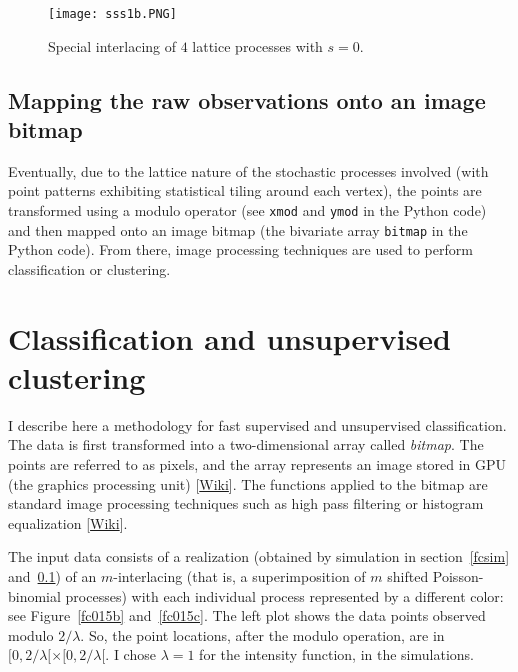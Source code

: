 \documentclass[oneside,10pt]{book}
\begin{document}
\begin{figure}[H]
\centering
\texttt{[image: sss1b.PNG]}
\caption{Special interlacing of $4$ lattice processes with $s=0$.}
\label{fcsss1}
\end{figure}

\subsection{Mapping the raw observations onto an image bitmap} \label{fcmap}

 Eventually, due to the lattice nature of the stochastic processes involved (with point patterns exhibiting statistical tiling around each vertex), the points are transformed using a modulo operator (see \texttt{xmod} and \texttt{ymod} in the Python code) and then mapped onto an image bitmap (the bivariate array \texttt{bitmap} in the Python code).
From there, image processing techniques are used to perform classification or clustering.

\section{Classification and unsupervised clustering}

I describe here a methodology for fast supervised and unsupervised
classification. The data is first transformed into a
two-dimensional array called {\em bitmap}. The points are referred to as pixels, and the array represents an image stored in
\textcolor{index}{GPU}
(the graphics processing unit) [\href{https://en.wikipedia.org/wiki/General-purpose_computing_on_graphics_processing_units}{Wiki}]. The functions applied to the bitmap are standard image processing techniques such as high pass filtering or
\textcolor{index}{histogram equalization} [\href{https://en.wikipedia.org/wiki/Histogram_equalization}{Wiki}].

The input data consists of a realization (obtained by simulation in section~\ref{fcsim} and~\ref{fcmap}) of an
\textcolor{index}{$m$-interlacing} (that is, a superimposition of $m$ shifted Poisson-binomial processes) with each individual process represented by a different color: see Figure~\ref{fc015b} and~\ref{fc015c}. The left plot shows the data points observed modulo $2/\lambda$. So, the point locations, after the modulo operation, are in
$[0, 2/\lambda[ \times [0, 2/\lambda[$. I chose $\lambda=1$ for the intensity function, in the simulations.
\end{document}

